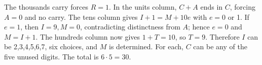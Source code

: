 The thousands carry forces $ R=1 $. In the units column, $ C+A $ ends in $ C $, forcing $ A=0 $ and no carry. The tens column gives $ I+1=M+10e $ with $ e=0 $ or 1. If $ e=1 $, then $ I=9,M=0 $, contradicting distinctness from $ A $; hence $ e=0 $ and $ M=I+1 $. The hundreds column now gives $ 1+T=10 $, so $ T=9 $. Therefore $ I $ can be 2,3,4,5,6,7, six choices, and $ M $ is determined. For each, $ C $ can be any of the five unused digits. The total is $ 6\cdot5=\boxed{30}$.
